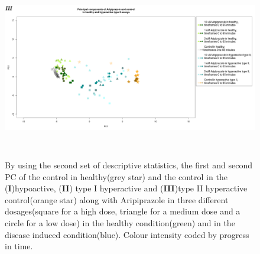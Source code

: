 \documentclass[a4paper,12pt]{article}
\begin{document}
\begin{figure}[h!]
\begin{center}
\includegraphics[width=16cm,height=8cm]{Aripiprazole_Control_DarkPTZ_turn_only.png}
\caption{By using the second set of descriptive statistics, the first and second PC of the control in healthy(grey star) and the control in the (\textbf{I})hypoactive, (\textbf{II}) type I hyperactive and (\textbf{III})type II hyperactive control(orange star) along with Aripiprazole in three different dosages(square for a high dose, triangle for a medium dose and a circle for a low dose) in the healthy condition(green) and in the disease induced condition(blue). Colour intensity coded by progress in time.}
\end{center}
\end{figure}
\newpage
\end{document}
